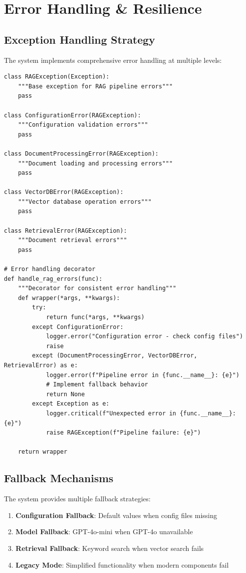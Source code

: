 \documentclass[12pt,a4paper]{article}
\begin{document}
\section{Error Handling \& Resilience}

\subsection{Exception Handling Strategy}

The system implements comprehensive error handling at multiple levels:

\begin{lstlisting}[caption=Error Handling Framework]
class RAGException(Exception):
    """Base exception for RAG pipeline errors"""
    pass

class ConfigurationError(RAGException):
    """Configuration validation errors"""
    pass

class DocumentProcessingError(RAGException):
    """Document loading and processing errors"""
    pass

class VectorDBError(RAGException):
    """Vector database operation errors"""
    pass

class RetrievalError(RAGException):
    """Document retrieval errors"""
    pass

# Error handling decorator
def handle_rag_errors(func):
    """Decorator for consistent error handling"""
    def wrapper(*args, **kwargs):
        try:
            return func(*args, **kwargs)
        except ConfigurationError:
            logger.error("Configuration error - check config files")
            raise
        except (DocumentProcessingError, VectorDBError, RetrievalError) as e:
            logger.error(f"Pipeline error in {func.__name__}: {e}")
            # Implement fallback behavior
            return None
        except Exception as e:
            logger.critical(f"Unexpected error in {func.__name__}: {e}")
            raise RAGException(f"Pipeline failure: {e}")
    
    return wrapper
\end{lstlisting}

\subsection{Fallback Mechanisms}

The system provides multiple fallback strategies:

\begin{enumerate}
    \item \textbf{Configuration Fallback}: Default values when config files missing
    \item \textbf{Model Fallback}: GPT-4o-mini when GPT-4o unavailable
    \item \textbf{Retrieval Fallback}: Keyword search when vector search fails
    \item \textbf{Legacy Mode}: Simplified functionality when modern components fail
\end{enumerate}
\end{document}
